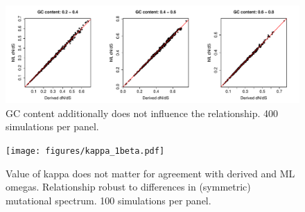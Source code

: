 \documentclass[11pt]{article}
\begin{document}
	
	



	
\newpage

	


\bigskip

\begin{figure}[H]
\centerline{\includegraphics[width=6in]{figures/gc_2beta.pdf}}
\caption{\label{gc} GC content additionally does not influence the relationship. 400 simulations per panel.}
\end{figure}

\begin{figure}[H]
\centerline{\texttt{[image: figures/kappa\_1beta.pdf]}}
\caption{\label{kappa} Value of kappa does not matter for agreement with derived and ML omegas. Relationship robust to differences in (symmetric) mutational spectrum. 100 simulations per panel.}
\end{figure}
\end{document}
